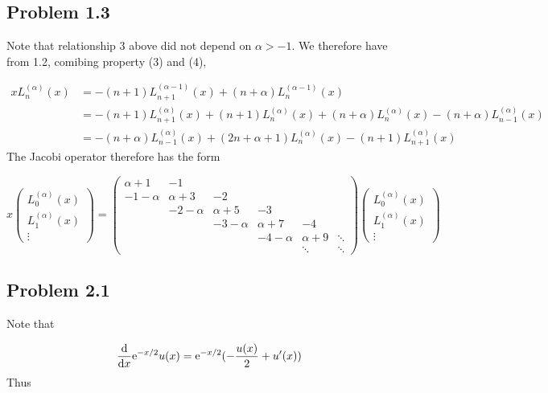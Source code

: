 \documentclass[12pt,a4paper]{article}
\def\D{ {\rm d} }
\def\E{ {\rm e} }
\def\dx{\D x}
\begin{document}
\subsection{Problem 1.3}
Note that relationship 3 above did not depend on $\alpha >-1$.  We therefore have from 1.2, comibing property (3) and (4),


\begin{align*}
x L_n^{(\alpha)}(x) &= -(n+1)L_{n+1}^{(\alpha-1)}(x) +(n+\alpha)L_n^{(\alpha-1)}(x) \\
  &= -(n+1)L_{n+1}^{(\alpha)}(x) + (n+1)L_{n}^{(\alpha)}(x) +(n+\alpha)L_{n}^{(\alpha)}(x) - (n+\alpha)L_{n-1}^{(\alpha)}(x) \\
  &= - (n+\alpha)L_{n-1}^{(\alpha)}(x) + (2n+\alpha+1) L_n^{(\alpha)}(x) -(n+1)L_{n+1}^{(\alpha)}(x)
\end{align*}
The Jacobi operator therefore has the form

\[
x \begin{pmatrix} L_0^{(\alpha)}(x) \\
            L_1^{(\alpha)}(x) \\
                \vdots
                \end{pmatrix} = \begin{pmatrix} \alpha+1 &-1 \\
                                                -1-\alpha & \alpha+3 & -2 \\
                                                   & -2-\alpha & \alpha+5 &-3 \\                  &       & -3-\alpha & \alpha+7 &-4 \\
                                                      &&   & -4-\alpha & \alpha+9 &\ddots \\
                                                      &&&&\ddots & \ddots
                                                    \end{pmatrix} \begin{pmatrix} L_0^{(\alpha)}(x) \\
            L_1^{(\alpha)}(x) \\
                \vdots
                \end{pmatrix}
\]
\subsection{Problem 2.1}
Note that

\[
{\D \over \dx} \E^{-x/2} u(x) =  \E^{-x/2} (-{u(x) \over 2} +u'(x)) 
\]
Thus 
\end{document}
